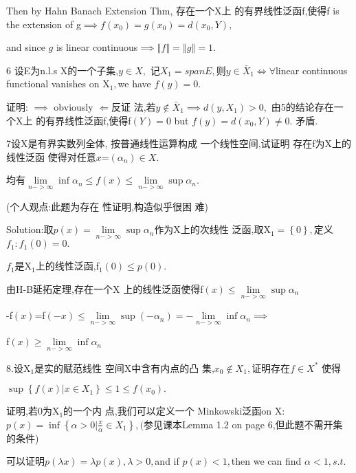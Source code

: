 \documentclass{article}
\begin{document}
Then by Hahn Banach Extension Thm, 存在一个X上%
的有界线性泛函f,使得f
is the extension of g$\implies f\left( x_{0}\right) =g\left( x_{0}\right)
=d\left( x_{0},Y\right) ,$

and since $g$ is linear continuous$\implies \left\Vert f\right\Vert
=\left\Vert g\right\Vert =1.$

6 设E为n.l.s X的一个子集,$y\in X,$%
记$X_{1}=spanE,$则$y\in \bar{X}_{1}\iff \forall $linear
continuous functional vanishes on X$_{1},$we have $f\left( y\right) =0.$

证明: $\implies $ obviously $\Longleftarrow $反证%
法,若$y\notin \bar{X}_{1}\implies d\left( y,X_{1}\right) >0,$%
由5的结论存在一个X上%
的有界线性泛函f,使得f$%
\left( Y\right) =0$ but $f\left( y\right) =d\left( x_{0},Y\right) \neq 0.$%
矛盾.

7设X是有界实数列全体,%
按普通线性运算构成%
一个线性空间,试证明%
存在f为X上的线性泛函%
使得对任意$x$=$\left( \alpha _{n}\right) \in
X. $

均有$\underset{n->\infty }{\lim }\inf \alpha _{n}\leq f\left(
x\right) \leq \underset{n->\infty }{\lim }\sup \alpha _{n}.$

(个人观点:此题为存在%
性证明,构造似乎很困%
难)

Solution:\bigskip 取$p\left( x\right) =\underset{n->\infty }{\lim }%
\sup \alpha _{n}$作为X上的次线性%
泛函,取X$_{1}=\left\{ 0\right\} ,$定义$%
f_{1}:f_{1}\left( 0\right) =0.$

$f_{1}$是X$_{1}$上的线性泛函,f$%
_{1}\left( 0\right) \leq p\left( 0\right) .$

由H-B延拓定理,存在一个X%
上的线性泛函使得f$\left(
x\right) \leq \underset{n->\infty }{\lim }\sup \alpha _{n}$

-f$\left( x\right) $=f$\left( -x\right) \leq \underset{n->\infty }{\lim }%
\sup \left( -\alpha _{n}\right) =-\underset{n->\infty }{\lim }\inf \alpha
_{n}\implies $

f$\left( x\right) \geq \underset{n->\infty }{\lim }\inf \alpha _{n}$

8.设X$_{1}$是实的赋范线性%
空间X中含有内点的凸%
集,$x_{0}\notin X_{1},$证明存在$f\in X^{\ast }$%
使得

$\sup \left\{ f\left( x\right) |x\in X_{1}\right\} \leq 1\leq f\left(
x_{0}\right) .$

证明,若0为X$_{1}$的一个内%
点,我们可以定义一个%
Minkowski泛函on X: $p\left( x\right) =\inf \left\{ \alpha >0|%
\frac{x}{\alpha }\in X_{1}\right\} ,($参见课本Lemma
1.2 on page 6,但此题不需开集%
的条件)

\bigskip 可以证明$p\left( \lambda x\right) =\lambda
p\left( x\right) ,\lambda >0,$and if $p\left( x\right) <1,$then we can find $%
\alpha <1,s.t.$
\end{document}
